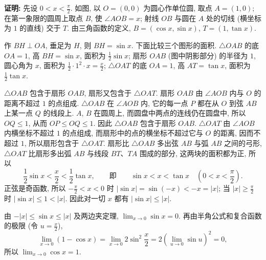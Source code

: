 \documentclass[UTF8,openany]{ctexbook}
\theoremstyle{chinesetextbook}
\newenvironment{cnproof}{\par\indent\textbf{证明:} \ignorespaces}{\par}
\begin{document}
\begin{cnproof}
先设 $\displaystyle0<x<\frac\pi2$. 如图, 以 $O=(0,0)$ 为圆心作单位圆, 取点 $A=(1,0)$; 在第一象限的圆周上取点 $B$, 使 $\angle AOB=x$; 射线 $OB$ 与圆在 $A$ 处的切线 (横坐标为 $1$ 的直线) 交于 $T$. 由三角函数的定义, $B=(\cos x,\sin x)$, $T=(1,\tan x)$.
\begin{center}
\end{center}
作 $BH\perp OA$, 垂足为 $H$, 则 $BH=\sin x$. 下面比较三个图形的面积. $\triangle OAB$ 的底 $OA=1$, 高 $BH=\sin x$, 面积为 $\displaystyle\frac12\sin x$; 扇形 $OAB$ (图中阴影部分) 的半径为 $1$, 圆心角为 $x$, 面积为 $\displaystyle\frac12\cdot1^2\cdot x=\frac x2$; $\triangle OAT$ 的底 $OA=1$, 高 $AT=\tan x$, 面积为 $\displaystyle\frac12\tan x$.

$\triangle OAB$ 包含于扇形 $OAB$, 扇形又包含于 $\triangle OAT$. 扇形 $OAB$ 由 $\angle AOB$ 内与 $O$ 的距离不超过 $1$ 的点组成. $\triangle OAB$ 在 $\angle AOB$ 内, 它的每一点 $P$ 都在从 $O$ 到弦 $AB$ 上某一点 $Q$ 的线段上. $A$, $B$ 在圆周上, 而圆盘中两点的连线仍在圆盘中, 所以 $OQ\le1$, 从而 $OP\le OQ\le1$. 因此 $\triangle OAB$ 包含于扇形 $OAB$. $\triangle OAT$ 由 $\angle AOB$ 内横坐标不超过 $1$ 的点组成, 而扇形中的点的横坐标不超过它与 $O$ 的距离, 因而不超过 $1$, 所以扇形包含于 $\triangle OAT$. 扇形比 $\triangle OAB$ 多出弦 $AB$ 与弧 $AB$ 之间的弓形, $\triangle OAT$ 比扇形多出弧 $AB$ 与线段 $BT$、$TA$ 围成的部分, 这两块的面积都为正, 所以
\[
\frac12\sin x<\frac x2<\frac12\tan x,\qquad\text{即}\qquad\sin x<x<\tan x\quad\left(0<x<\frac\pi2\right).
\]
正弦是奇函数, 所以 $\displaystyle-\frac\pi2<x<0$ 时 $|\sin x|=\sin(-x)<-x=|x|$; 当 $\displaystyle|x|\ge\frac\pi2$ 时 $|\sin x|\le1<|x|$. 因此对一切 $x$ 都有 $|\sin x|\le|x|$.

由 $-|x|\le\sin x\le|x|$ 及两边夹定理, $\displaystyle\lim_{x\to0}\sin x=0$. 再由半角公式和复合函数的极限 (令 $\displaystyle u=\frac x2$),
\[
\lim_{x\to0}(1-\cos x)=\lim_{x\to0}2\sin^2\frac x2=2\left(\lim_{u\to0}\sin u\right)^2=0,
\]
所以 $\displaystyle\lim_{x\to0}\cos x=1$.
\end{cnproof}
\end{document}
